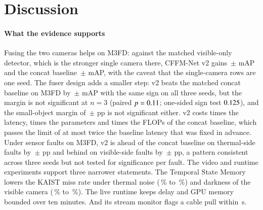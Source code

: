 \section{Discussion}
\label{sec:discussion}
\paragraph{What the evidence supports}
Fusing the two cameras helps on M3FD: against the matched visible-only detector, which is the stronger single camera there, CFFM-Net v2 gains \gainMfdCffmVtwoOverBestMeanMap{}\,$\pm$\,\gainMfdCffmVtwoOverBestStdMap{}\,mAP and the concat baseline \gainMfdConcatMdOverBestMeanMap{}\,$\pm$\,\gainMfdConcatMdOverBestStdMap{}\,mAP, with the caveat that the single-camera rows are one seed. The fuser design adds a smaller step: v2 beats the matched concat baseline on M3FD by \marMfdVtwoVsConcatMdMeanMap{}\,$\pm$\,\marMfdVtwoVsConcatMdStdMap{}\,mAP with the same sign on all three seeds, but the margin is not significant at $n=3$ (paired $p=0.11{}$; one-sided sign test $0.125{}$), and the small-object margin of \marMfdVtwoVsConcatMdMeanApSmall{}\,$\pm$\,\marMfdVtwoVsConcatMdStdApSmall{}\,pp is not significant either. v2 costs \latLocalRatioMedian{} times the latency, \latLocalRatioParams{} times the parameters and \latLocalRatioGflops{} times the FLOPs of the concat baseline, which passes the limit of at most twice the baseline latency that was fixed in advance. Under sensor faults on M3FD, v2 is ahead of the concat baseline on thermal-side faults by \fltMfdMarginMeanThermalAvgSevThreeMap{}\,$\pm$\,\fltMfdMarginStdThermalAvgSevThreeMap{}\,pp and behind on visible-side faults by \fltMfdMarginMeanVisibleAvgSevThreeMap{}\,$\pm$\,\fltMfdMarginStdVisibleAvgSevThreeMap{}\,pp, a pattern consistent across three seeds but not tested for significance per fault. The video and runtime experiments support three narrower statements. The Temporal State Memory lowers the KAIST miss rate under thermal noise (\memThermalNoiseImageAllMr{}\,\% to \memThermalNoiseMemoryAllMr{}\,\%) and darkness of the visible camera (\memVisibleDarkImageAllMr{}\,\% to \memVisibleDarkMemoryAllMr{}\,\%). The live runtime keeps delay and GPU memory bounded over ten minutes. And its stream monitor flags a cable pull within \livFaultOnUnpluggedDetectS{}\,s.

